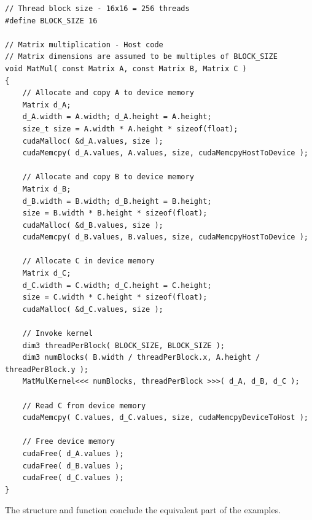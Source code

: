 \begin{lstlisting}[caption={Definition of the function that will allocate and copy all matrices to the device, invoke the kernel and then free the device memory. The size of the thread block is constant and set during compile time using the \code{\#define} macro. Taken from Nvidia's \emph{CUDA C++ Programming Guide} \cite{NVIDIAMay2022}.},label={Listing:CUDA-matrix-multiplication-host-mat-mul-function}]
// Thread block size - 16x16 = 256 threads
#define BLOCK_SIZE 16

// Matrix multiplication - Host code
// Matrix dimensions are assumed to be multiples of BLOCK_SIZE
void MatMul( const Matrix A, const Matrix B, Matrix C )
{
	// Allocate and copy A to device memory
	Matrix d_A;
	d_A.width = A.width; d_A.height = A.height;
	size_t size = A.width * A.height * sizeof(float);
	cudaMalloc( &d_A.values, size );
	cudaMemcpy( d_A.values, A.values, size, cudaMemcpyHostToDevice );
	
	// Allocate and copy B to device memory
	Matrix d_B;
	d_B.width = B.width; d_B.height = B.height;
	size = B.width * B.height * sizeof(float);
	cudaMalloc( &d_B.values, size );
	cudaMemcpy( d_B.values, B.values, size, cudaMemcpyHostToDevice );
	
	// Allocate C in device memory
	Matrix d_C;
	d_C.width = C.width; d_C.height = C.height;
	size = C.width * C.height * sizeof(float);
	cudaMalloc( &d_C.values, size );
	
	// Invoke kernel
	dim3 threadPerBlock( BLOCK_SIZE, BLOCK_SIZE );
	dim3 numBlocks( B.width / threadPerBlock.x, A.height / threadPerBlock.y );
	MatMulKernel<<< numBlocks, threadPerBlock >>>( d_A, d_B, d_C );
	
	// Read C from device memory
	cudaMemcpy( C.values, d_C.values, size, cudaMemcpyDeviceToHost );
	
	// Free device memory
	cudaFree( d_A.values );
	cudaFree( d_B.values );
	cudaFree( d_C.values );
}
\end{lstlisting}

The  structure and  function conclude the equivalent part of the examples.

